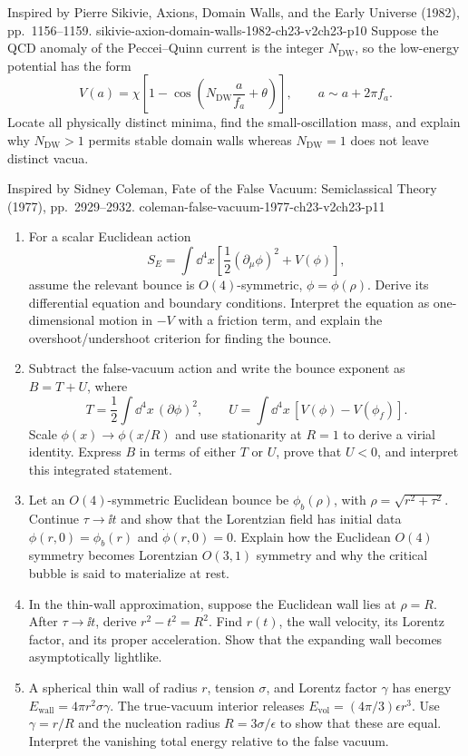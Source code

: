 \begin{enumerate}
  {Inspired by Pierre Sikivie, Axions, Domain Walls, and the Early
  Universe (1982), pp.~1156--1159.}
  {sikivie-axion-domain-walls-1982-ch23-v2ch23-p10}
  Suppose the QCD anomaly of the Peccei--Quinn current is the integer
  \(N_{\mathrm{DW}}\), so the low-energy potential has the form
  \[
    V(a)=\chi\left[
      1-\cos\left(N_{\mathrm{DW}}\frac a{f_a}+\theta\right)\right],
    \qquad a\sim a+2\pi f_a.
  \]
  Locate all physically distinct minima, find the small-oscillation
  mass, and explain why \(N_{\mathrm{DW}}>1\) permits stable domain
  walls whereas \(N_{\mathrm{DW}}=1\) does not leave distinct vacua.

  {Inspired by Sidney Coleman, Fate of the False Vacuum:
  Semiclassical Theory (1977), pp.~2929--2932.}
  {coleman-false-vacuum-1977-ch23-v2ch23-p11}
  \begin{enumerate}
    \item[(a)]
    For a scalar Euclidean action
    \[
      S_E=\int \dd^4x\left[\frac12(\partial_\mu\phi)^2+V(\phi)\right],
    \]
    assume the relevant bounce is \(O(4)\)-symmetric,
    \(\phi=\phi(\rho)\).  Derive its differential equation and boundary
    conditions.  Interpret the equation as one-dimensional motion in
    \(-V\) with a friction term, and explain the overshoot/undershoot
    criterion for finding the bounce.
    \item[(b)]
    Subtract the false-vacuum action and write the bounce exponent as
    \(B=T+U\), where
    \[
      T=\frac12\int \dd^4x\,(\partial\phi)^2,\qquad
      U=\int \dd^4x\,[V(\phi)-V(\phi_f)].
    \]
    Scale \(\phi(x)\to\phi(x/R)\) and use stationarity at \(R=1\) to
    derive a virial identity.  Express \(B\) in terms of either \(T\) or
    \(U\), prove that \(U<0\), and interpret this integrated statement.
    \item[(c)]
    Let an \(O(4)\)-symmetric Euclidean bounce be
    \(\phi_b(\rho)\), with
    \(\rho=\sqrt{r^2+\tau^2}\).  Continue \(\tau\to \ii t\) and show that the
    Lorentzian field has initial data
    \(\phi(r,0)=\phi_b(r)\) and \(\dot\phi(r,0)=0\).  Explain how the
    Euclidean \(O(4)\) symmetry becomes Lorentzian \(O(3,1)\) symmetry and
    why the critical bubble is said to materialize at rest.
    \item[(d)]
    In the thin-wall approximation, suppose the Euclidean wall lies at
    \(\rho=R\).  After \(\tau\to \ii t\), derive
    \(r^2-t^2=R^2\).  Find \(r(t)\), the wall velocity, its Lorentz factor,
    and its proper acceleration.  Show that the expanding wall becomes
    asymptotically lightlike.
    \item[(e)]
    A spherical thin wall of radius \(r\), tension \(\sigma\), and Lorentz
    factor \(\gamma\) has energy
    \(E_{\mathrm{wall}}=4\pi r^2\sigma\gamma\).  The true-vacuum interior
    releases
    \(E_{\mathrm{vol}}=(4\pi/3)\epsilon r^3\).  Use
    \(\gamma=r/R\) and the nucleation radius
    \(R=3\sigma/\epsilon\) to show that these are equal.  Interpret the
    vanishing total energy relative to the false vacuum.
  \end{enumerate}


\end{enumerate}
